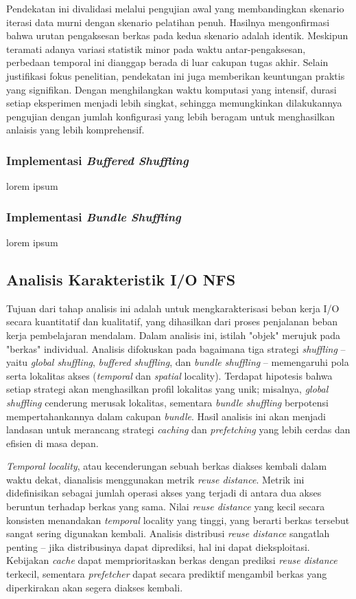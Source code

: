 Pendekatan ini divalidasi melalui pengujian awal yang membandingkan skenario iterasi data murni dengan skenario pelatihan penuh. Hasilnya mengonfirmasi bahwa urutan pengaksesan berkas pada kedua skenario adalah identik. Meskipun teramati adanya variasi statistik minor pada waktu antar-pengaksesan, perbedaan temporal ini dianggap berada di luar cakupan tugas akhir. Selain justifikasi fokus penelitian, pendekatan ini juga memberikan keuntungan praktis yang signifikan. Dengan menghilangkan waktu komputasi yang intensif, durasi setiap eksperimen menjadi lebih singkat, sehingga memungkinkan dilakukannya pengujian dengan jumlah konfigurasi yang lebih beragam untuk menghasilkan anlaisis yang lebih komprehensif.

\subsubsection{Implementasi \textit{Buffered Shuffling}}
lorem ipsum

\subsubsection{Implementasi \textit{Bundle Shuffling}}
lorem ipsum

\subsection{Analisis Karakteristik I/O NFS}
Tujuan dari tahap analisis ini adalah untuk mengkarakterisasi beban kerja I/O secara kuantitatif dan kualitatif, yang dihasilkan dari proses penjalanan beban kerja pembelajaran mendalam. Dalam analisis ini, istilah "objek" merujuk pada "berkas" individual. Analisis difokuskan pada bagaimana tiga strategi \textit{shuffling} -- yaitu \textit{global shuffling}, \textit{buffered shuffling}, dan \textit{bundle shuffling} -- memengaruhi pola serta lokalitas akses (\textit{temporal} dan \textit{spatial} locality). Terdapat hipotesis bahwa setiap strategi akan menghasilkan profil lokalitas yang unik; misalnya, \textit{global shuffling} cenderung merusak lokalitas, sementara \textit{bundle shuffling} berpotensi mempertahankannya dalam cakupan \textit{bundle}. Hasil analisis ini akan menjadi landasan untuk merancang strategi \textit{caching} dan \textit{prefetching} yang lebih cerdas dan efisien di masa depan.

\textit{Temporal locality}, atau kecenderungan sebuah berkas diakses kembali dalam waktu dekat, dianalisis menggunakan metrik \textit{reuse distance}. Metrik ini didefinisikan sebagai jumlah operasi akses yang terjadi di antara dua akses beruntun terhadap berkas yang sama. Nilai \textit{reuse distance} yang kecil secara konsisten menandakan \textit{temporal} locality yang tinggi, yang berarti berkas tersebut sangat sering digunakan kembali. Analisis distribusi \textit{reuse distance} sangatlah penting -- jika distribusinya dapat diprediksi, hal ini dapat dieksploitasi. Kebijakan \textit{cache} dapat memprioritaskan berkas dengan prediksi \textit{reuse distance} terkecil, sementara \textit{prefetcher} dapat secara prediktif mengambil berkas yang diperkirakan akan segera diakses kembali.

